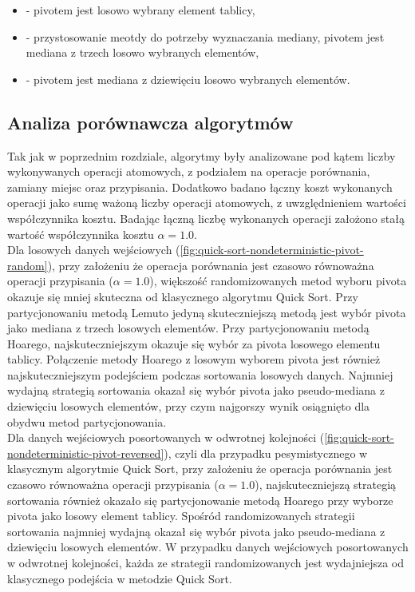 \begin{itemize}
	\setlength\itemsep{0em}
	\item {} - pivotem jest losowo wybrany element tablicy,
	\item {} - przystosowanie meotdy  do potrzeby wyznaczania mediany, pivotem jest mediana z trzech losowo wybranych elementów,
	\item {} - pivotem jest mediana z dziewięciu losowo wybranych elementów.\\
\end{itemize}

\subsection{Analiza porównawcza algorytmów}
Tak jak w poprzednim rozdziale, algorytmy były analizowane pod kątem liczby wykonywanych operacji atomowych, z podziałem na operacje porównania, zamiany miejsc oraz przypisania. Dodatkowo badano łączny koszt wykonanych operacji jako sumę ważoną liczby operacji atomowych, z uwzględnieniem wartości współczynnika kosztu. Badając łączną liczbę wykonanych operacji założono stałą wartość współczynnika kosztu $\alpha = 1.0$.\\

Dla losowych danych wejściowych (\ref{fig:quick-sort-nondeterministic-pivot-random}), przy założeniu że operacja porównania jest czasowo równoważna operacji przypisania ($\alpha=1.0$), większość randomizowanych metod wyboru pivota okazuje się mniej skuteczna od klasycznego algorytmu Quick Sort. Przy partycjonowaniu metodą Lemuto jedyną skuteczniejszą metodą jest wybór pivota jako mediana z trzech losowych elementów. Przy partycjonowaniu metodą Hoarego, najskuteczniejszym okazuje się wybór za pivota losowego elementu tablicy. Połączenie metody Hoarego z losowym wyborem pivota jest również najskuteczniejszym podejściem podczas sortowania losowych danych. Najmniej wydajną strategią sortowania okazał się wybór pivota jako pseudo-mediana z dziewięciu losowych elementów, przy czym najgorszy wynik osiągnięto dla obydwu metod partycjonowania.\\

Dla danych wejściowych posortowanych w odwrotnej kolejności (\ref{fig:quick-sort-nondeterministic-pivot-reversed}), czyli dla przypadku pesymistycznego w klasycznym algorytmie Quick Sort, przy założeniu że operacja porównania jest czasowo równoważna operacji przypisania ($\alpha=1.0$), najskuteczniejszą strategią sortowania również okazało się partycjonowanie metodą Hoarego przy wyborze pivota jako losowy element tablicy. Spośród randomizowanych strategii sortowania najmniej wydajną okazał się wybór pivota jako pseudo-mediana z dziewięciu losowych elementów. W przypadku danych wejściowych posortowanych w odwrotnej kolejności, każda ze strategii randomizowanych jest wydajniejsza od klasycznego podejścia w metodzie Quick Sort.\\

